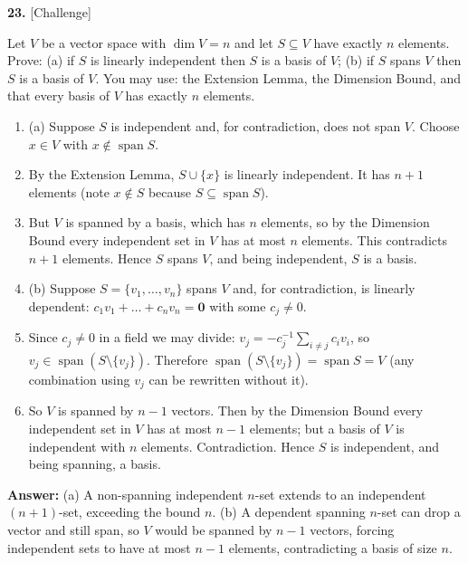 \documentclass[11pt]{article}
\begin{document}
\par\vspace{2pt}
\begin{minipage}{\linewidth}\textbf{23.} \hfill{\scriptsize\color{ink}[Challenge]}\par\nopagebreak Let $V$ be a vector space with $\dim V=n$ and let $S\subseteq V$ have exactly $n$ elements. Prove: (a) if $S$ is linearly independent then $S$ is a basis of $V$; (b) if $S$ spans $V$ then $S$ is a basis of $V$. You may use: the Extension Lemma, the Dimension Bound, and that every basis of $V$ has exactly $n$ elements.
\end{minipage}\par\nopagebreak
\begin{tcolorbox}[breakable,colback=ans,colframe=ansb,boxrule=0.5pt,left=4pt,right=4pt,top=2pt,bottom=2pt]\begin{enumerate}[leftmargin=3.1em,itemsep=1pt,topsep=1pt,label=\textbf{Step \arabic*.}]\item (a) Suppose $S$ is independent and, for contradiction, does not span $V$. Choose $x\in V$ with $x\notin\operatorname{span}S$.
\item By the Extension Lemma, $S\cup\{x\}$ is linearly independent. It has $n+1$ elements (note $x\notin S$ because $S\subseteq\operatorname{span}S$).
\item But $V$ is spanned by a basis, which has $n$ elements, so by the Dimension Bound every independent set in $V$ has at most $n$ elements. This contradicts $n+1$ elements. Hence $S$ spans $V$, and being independent, $S$ is a basis.
\item (b) Suppose $S=\{v_1,\dots,v_n\}$ spans $V$ and, for contradiction, is linearly dependent: $c_1v_1+\dots+c_nv_n=\mathbf 0$ with some $c_j\neq0$.
\item Since $c_j\neq0$ in a field we may divide: $v_j=-c_j^{-1}\sum_{i\neq j}c_iv_i$, so $v_j\in\operatorname{span}(S\setminus\{v_j\})$. Therefore $\operatorname{span}(S\setminus\{v_j\})=\operatorname{span}S=V$ (any combination using $v_j$ can be rewritten without it).
\item So $V$ is spanned by $n-1$ vectors. Then by the Dimension Bound every independent set in $V$ has at most $n-1$ elements; but a basis of $V$ is independent with $n$ elements. Contradiction. Hence $S$ is independent, and being spanning, a basis.
\end{enumerate}\textbf{Answer:} (a) A non-spanning independent $n$-set extends to an independent $(n+1)$-set, exceeding the bound $n$. (b) A dependent spanning $n$-set can drop a vector and still span, so $V$ would be spanned by $n-1$ vectors, forcing independent sets to have at most $n-1$ elements, contradicting a basis of size $n$.\end{tcolorbox}
\end{document}

